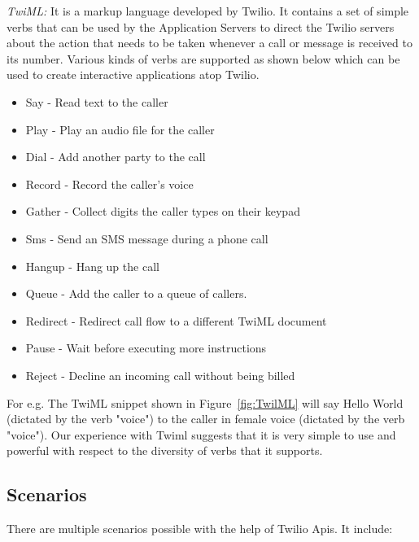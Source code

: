 \emph{TwiML:  } It is a markup language developed by Twilio. It contains a set of simple verbs that can be used by the Application Servers to direct the Twilio servers about the action that needs to be taken whenever a call or message is received to its number. Various kinds of verbs are supported as shown below which can be used to create interactive applications atop Twilio.
\begin{itemize}
\item Say - Read text to the caller 
\item Play - Play an audio file for the caller
\item Dial - Add another party to the call
\item Record - Record the caller's voice
\item Gather - Collect digits the caller types on their keypad
\item Sms - Send an SMS message during a phone call
\item Hangup - Hang up the call
\item Queue - Add the caller to a queue of callers.
\item Redirect - Redirect call flow to a different TwiML document
\item Pause - Wait before executing more instructions
\item Reject - Decline an incoming call without being billed
\end{itemize}

For e.g. The TwiML snippet shown in Figure~\ref{fig:TwilML} will say Hello World (dictated by the verb "voice") to the caller in female voice (dictated by the verb "voice"). Our experience with Twiml suggests that it is very simple to use and powerful with respect to the diversity of verbs that it supports.



\subsection{Scenarios}

There are multiple scenarios possible with the help of Twilio Apis. It include:

